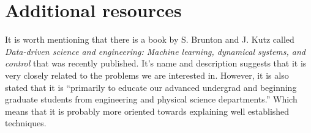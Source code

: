 \documentclass{article}
\begin{document}
\section{Additional resources}

It is worth mentioning that there is a book \cite{brunton2019data} by S. Brunton and J. Kutz called \textit{Data-driven science and engineering: Machine learning, dynamical systems, and control} that was recently published. 
It's name and description suggests that it is very closely related to the problems we are interested in.
However, it is also stated that it is ``primarily to educate our advanced undergrad and beginning graduate students from engineering and physical science departments.'' Which means that it is probably more oriented towards explaining well established techniques.




\end{document}
